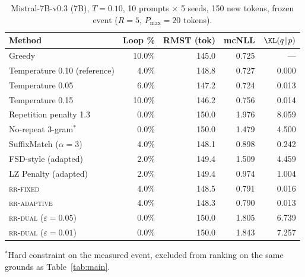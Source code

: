 \begin{table}[ht]
\centering
\caption{Mistral-7B-v0.3 (7B), $T{=}0.10$, 10 prompts $\times$ 5 seeds, 150 new tokens, frozen event ($R{=}5$, $P_{\max}{=}20$ tokens).}
\label{tab:mistralfull}
\begin{tabular}{@{}lrrrr@{}}
\toprule
Method & Loop \% & RMST (tok) & mcNLL & $\KL(q\Vert p)$ \\
\midrule
Greedy                      & 10.0\% & 145.0 & 0.725 & --- \\
Temperature 0.10 (reference) & 4.0\%  & 148.8 & 0.727 & 0.000 \\
Temperature 0.05             & 6.0\%  & 147.2 & 0.724 & 0.013 \\
Temperature 0.15             & 10.0\% & 146.2 & 0.756 & 0.014 \\
Repetition penalty 1.3        & 0.0\%  & 150.0 & 1.976 & 8.059 \\
No-repeat 3-gram$^{*}$       & 0.0\%  & 150.0 & 1.479 & 4.500 \\
SuffixMatch ($\alpha{=}3$)    & 4.0\%  & 148.1 & 0.898 & 0.242 \\
FSD-style (adapted)          & 2.0\%  & 149.4 & 1.509 & 4.459 \\
LZ Penalty (adapted)        & 2.0\%  & 149.4 & 0.974 & 1.004 \\
\textsc{rr-fixed}             & 4.0\%  & 148.5 & 0.791 & 0.016 \\
\textsc{rr-adaptive}          & 4.0\%  & 148.3 & 0.790 & 0.013 \\
\textsc{rr-dual} ($\varepsilon{=}0.05$) & 0.0\% & 150.0 & 1.805 & 6.739 \\
\textsc{rr-dual} ($\varepsilon{=}0.01$) & 0.0\% & 150.0 & 1.843 & 7.257 \\
\bottomrule
\end{tabular}

\vspace{4pt}
{\footnotesize $^{*}$Hard constraint on the measured event, excluded from ranking on the same grounds as Table~\ref{tab:main}.}
\end{table}

